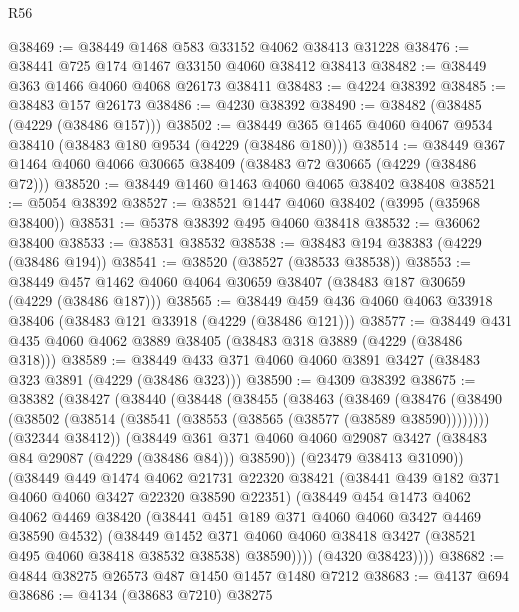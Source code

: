 \begin{lexlean}{R56}
\begin{coremodule}
@38469 := @38449 @1468 @583 @33152 @4062 @38413 @31228
@38476 := @38441 @725 @174 @1467 @33150 @4060 @38412 @38413
@38482 := @38449 @363 @1466 @4060 @4068 @26173 @38411
@38483 := @4224 @38392
@38485 := @38483 @157 @26173
@38486 := @4230 @38392
@38490 := @38482 (@38485 (@4229 (@38486 @157)))
@38502 := @38449 @365 @1465 @4060 @4067 @9534 @38410 (@38483 @180 @9534 (@4229 (@38486 @180)))
@38514 := @38449 @367 @1464 @4060 @4066 @30665 @38409 (@38483 @72 @30665 (@4229 (@38486 @72)))
@38520 := @38449 @1460 @1463 @4060 @4065 @38402 @38408
@38521 := @5054 @38392
@38527 := @38521 @1447 @4060 @38402 (@3995 (@35968 @38400))
@38531 := @5378 @38392 @495 @4060 @38418
@38532 := @36062 @38400
@38533 := @38531 @38532
@38538 := @38483 @194 @38383 (@4229 (@38486 @194))
@38541 := @38520 (@38527 (@38533 @38538))
@38553 := @38449 @457 @1462 @4060 @4064 @30659 @38407 (@38483 @187 @30659 (@4229 (@38486 @187)))
@38565 := @38449 @459 @436 @4060 @4063 @33918 @38406 (@38483 @121 @33918 (@4229 (@38486 @121)))
@38577 := @38449 @431 @435 @4060 @4062 @3889 @38405 (@38483 @318 @3889 (@4229 (@38486 @318)))
@38589 := @38449 @433 @371 @4060 @4060 @3891 @3427 (@38483 @323 @3891 (@4229 (@38486 @323)))
@38590 := @4309 @38392
@38675 := @38382
    (@38427
      (@38440
        (@38448
          (@38455
            (@38463
              (@38469
                (@38476
                  (@38490 (@38502 (@38514 (@38541 (@38553 (@38565 (@38577 (@38589 @38590))))))))
                  (@32344 @38412))
                (@38449
                  @361
                  @371
                  @4060
                  @4060
                  @29087
                  @3427
                  (@38483 @84 @29087 (@4229 (@38486 @84)))
                  @38590))
              (@23479 @38413 @31090))
            (@38449
              @449
              @1474
              @4062
              @21731
              @22320
              @38421
              (@38441 @439 @182 @371 @4060 @4060 @3427 @22320 @38590 @22351)
              (@38449
                @454
                @1473
                @4062
                @4062
                @4469
                @38420
                (@38441 @451 @189 @371 @4060 @4060 @3427 @4469 @38590 @4532)
                (@38449
                  @1452
                  @371
                  @4060
                  @4060
                  @38418
                  @3427
                  (@38521 @495 @4060 @38418 @38532 @38538)
                  @38590))))
          (@4320 @38423))))
@38682 := @4844 @38275 @26573 @487 @1450 @1457 @1480 @7212
@38683 := @4137 @694
@38686 := @4134 (@38683 @7210) @38275

\end{coremodule}
\end{lexlean}
